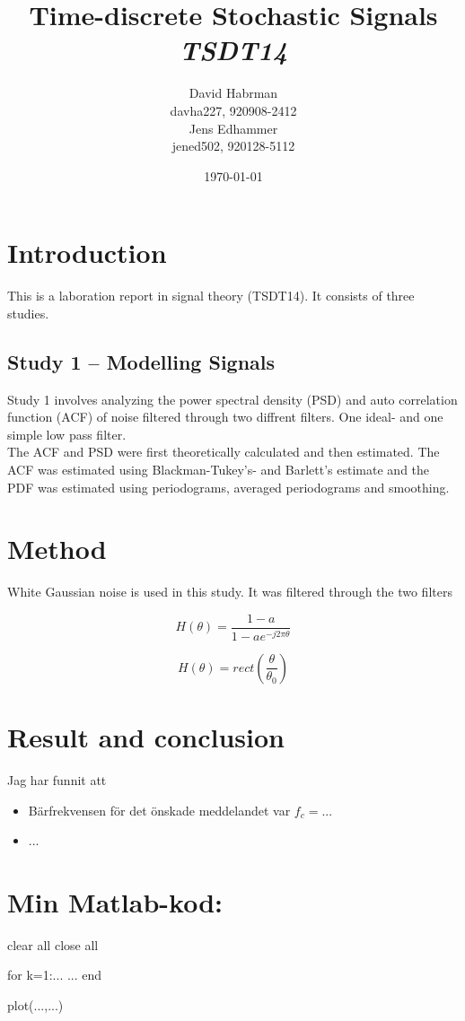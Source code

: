 \documentclass[10pt]{article}
\title{Time-discrete Stochastic Signals\\
\emph{TSDT14}}
\author{David Habrman \\ davha227, 920908-2412\\
Jens Edhammer \\ jened502, 920128-5112 }
\date{\today}
\begin{document}
\maketitle

\section{Introduction}
This is a laboration report in signal theory (TSDT14). It consists of three studies.

\subsection{Study 1 – Modelling Signals}
 Study 1 involves analyzing the power spectral density (PSD) and auto correlation function (ACF) of noise filtered through two diffrent filters. One ideal- and one simple low pass filter.\\

The ACF and PSD were first  theoretically calculated and then estimated. The ACF was estimated using Blackman-Tukey's- and Barlett's estimate and the PDF was estimated using periodograms, averaged periodograms and smoothing.

\section{Method}

White Gaussian noise is used in this study. It was filtered through the two filters 

\begin{equation}
  H(\theta) =\frac{1-a}{1-ae^{-j2\pi\theta }}
\end{equation}

\begin{equation}
  H(\theta) =rect(\frac{\theta}{\theta_0} )
\end{equation}

\section{Result and conclusion}

Jag har funnit att
\begin{itemize}
\item B\"arfrekvensen f\"or det \"onskade meddelandet var $f_c=...$
\item ...
\end{itemize}

\clearpage

\section*{Min Matlab-kod:}
\begin{spverbatim}
clear all
close all

for k=1:...
  ...
end

plot(...,...)
\end{spverbatim}
\end{document}
